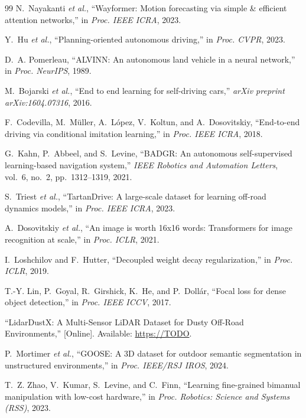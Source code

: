 \documentclass[journal]{IEEEtran}
\begin{document}
\begin{thebibliography}{99}
N.~Nayakanti \textit{et al.}, ``Wayformer: Motion forecasting via simple \& efficient attention networks,'' in \textit{Proc. IEEE ICRA}, 2023.

Y.~Hu \textit{et al.}, ``Planning-oriented autonomous driving,'' in \textit{Proc. CVPR}, 2023.

D.~A. Pomerleau, ``ALVINN: An autonomous land vehicle in a neural network,'' in \textit{Proc. NeurIPS}, 1989.

M.~Bojarski \textit{et al.}, ``End to end learning for self-driving cars,'' \textit{arXiv preprint arXiv:1604.07316}, 2016.

F.~Codevilla, M.~M{\"u}ller, A.~L{\'o}pez, V.~Koltun, and A.~Dosovitskiy, ``End-to-end driving via conditional imitation learning,'' in \textit{Proc. IEEE ICRA}, 2018.

G.~Kahn, P.~Abbeel, and S.~Levine, ``BADGR: An autonomous self-supervised learning-based navigation system,'' \textit{IEEE Robotics and Automation Letters}, vol.~6, no.~2, pp.~1312--1319, 2021.

S.~Triest \textit{et al.}, ``TartanDrive: A large-scale dataset for learning off-road dynamics models,'' in \textit{Proc. IEEE ICRA}, 2023.

A.~Dosovitskiy \textit{et al.}, ``An image is worth 16x16 words: Transformers for image recognition at scale,'' in \textit{Proc. ICLR}, 2021.

I.~Loshchilov and F.~Hutter, ``Decoupled weight decay regularization,'' in \textit{Proc. ICLR}, 2019.

T.-Y. Lin, P.~Goyal, R.~Girshick, K.~He, and P.~Doll{\'a}r, ``Focal loss for dense object detection,'' in \textit{Proc. IEEE ICCV}, 2017.

``LidarDustX: A Multi-Sensor LiDAR Dataset for Dusty Off-Road Environments,'' [Online]. Available: \url{https://TODO}.

P.~Mortimer \textit{et al.}, ``GOOSE: A 3D dataset for outdoor semantic segmentation in unstructured environments,'' in \textit{Proc. IEEE/RSJ IROS}, 2024.

T.~Z. Zhao, V.~Kumar, S.~Levine, and C.~Finn, ``Learning fine-grained bimanual manipulation with low-cost hardware,'' in \textit{Proc. Robotics: Science and Systems (RSS)}, 2023.

\end{thebibliography}
\end{document}
